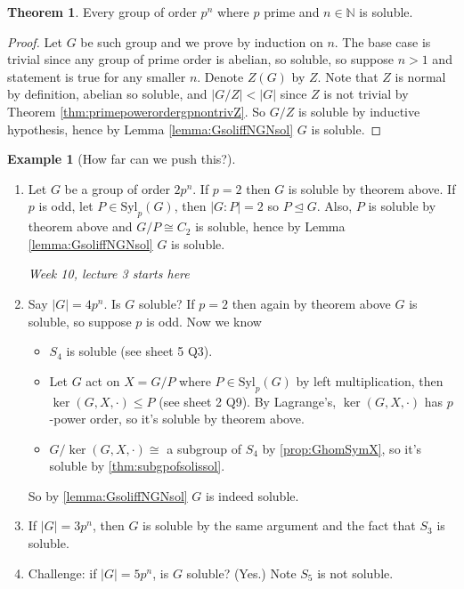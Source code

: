 \documentclass[a4paper]{article}
\newcommand{\N}{\mathbb{N}}
\newcommand{\Syl}{\text{Syl}}
\theoremstyle{definition}
\newtheorem{thm}[defn]{Theorem}
\newtheorem{example}[defn]{Example}
\begin{document}
\begin{thm}
Every group of order $p^n$ where $p$ prime and $n\in\N$ is soluble.
\end{thm}
\begin{proof}
Let $G$ be such group and we prove by induction on $n$. The base case is trivial since any group of prime order is abelian, so soluble, so suppose $n>1$ and statement is true for any smaller $n$. Denote $Z(G)$ by $Z$. Note that $Z$ is normal by definition, abelian so soluble, and $|G/Z|<|G|$ since $Z$ is not trivial by Theorem \ref{thm:primepowerordergpnontrivZ}. So $G/Z$ is soluble by inductive hypothesis, hence by Lemma \ref{lemma:GsoliffNGNsol} $G$ is soluble.
\end{proof}

\begin{example}[How far can we push this?]
\begin{enumerate}
\item Let $G$ be a group of order $2p^n$. If $p=2$ then $G$ is soluble by theorem above. If $p$ is odd, let $P\in\Syl_p(G)$, then $|G:P|=2$ so $P\unlhd G$. Also, $P$ is soluble by theorem above and $G/P\cong C_2$ is soluble, hence by Lemma \ref{lemma:GsoliffNGNsol} $G$ is soluble.
\begin{flushright}
\textit{Week 10, lecture 3 starts here}
\end{flushright}
\item Say $|G|=4p^n$. Is $G$ soluble? If $p=2$ then again by theorem above $G$ is soluble, so suppose $p$ is odd. Now we know
\begin{itemize}
\item $S_4$ is soluble (see sheet 5 Q3).
\item Let $G$ act on $X=G/P$ where $P\in\Syl_p(G)$ by left multiplication, then $\ker(G,X,\cdot)\leq P$ (see sheet 2 Q9). By Lagrange's, $\ker(G,X,\cdot)$ has $p$-power order, so it's soluble by theorem above.
\item $G/\ker(G,X,\cdot)\cong$ a subgroup of $S_4$ by \ref{prop:GhomSymX}, so it's soluble by \ref{thm:subgpofsolissol}.
\end{itemize}
So by \ref{lemma:GsoliffNGNsol} $G$ is indeed soluble.
\item If $|G|=3p^n$, then $G$ is soluble by the same argument and the fact that $S_3$ is soluble.
\item Challenge: if $|G|=5p^n$, is $G$ soluble? (Yes.) Note $S_5$ is not soluble.
\end{enumerate}
\end{example}
\end{document}
